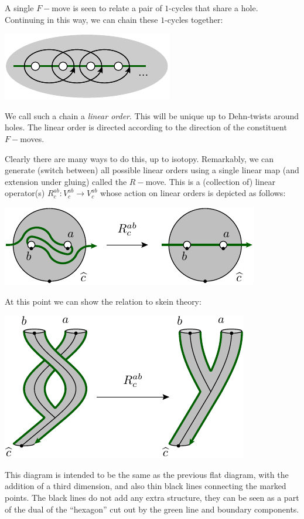 \documentclass[aps, prl, letterpaper, twocolumn, superscriptaddress, notitlepage, 10pt]{revtex4-1}
\begin{document}
A single $F-$move is seen to relate a pair of $1$-cycles %
that share a hole.
Continuing in this way, we can chain these $1$-cycles together: %
\begin{center}
\includegraphics[]{pic-chain.pdf}
\end{center}

We call such a chain a \emph{linear order}.
This will be unique up to Dehn-twists around holes.
The linear order is directed according to the direction
of the constituent $F-$moves.

Clearly there are many ways to do this, up to isotopy.
Remarkably, we can generate (switch between)
all possible linear orders using 
a single linear map (and extension under gluing)
called the $R-$move.
This is a (collection of) linear operator(s)
$R^{ab}_c:V^{ab}_c\to V^{ab}_c$
whose action on linear orders is depicted as follows:
\begin{center}
\includegraphics[]{pic-rmove-1.pdf}
\end{center}

At this point we can show the relation to skein theory:
\begin{center}
\includegraphics[]{pic-rmove-skein.pdf}
\end{center}
This diagram is intended to be the same as the previous flat
diagram,
with the addition of a third dimension, and also thin black lines
connecting the marked points.
The black lines do not add any extra structure, they can
be seen as a part of the dual of the ``hexagon'' cut out by
the green line and boundary components.
\end{document}
